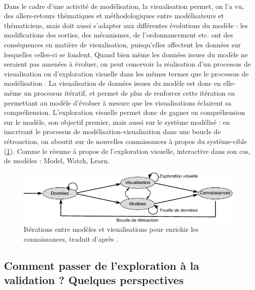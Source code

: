 \paragraph[Ccl : Modélisation et visualisation]{}
Dans le cadre d'une activité de modélisation, la visualisation permet, on l'a vu, des allers-retours thématiques et méthodologiques entre modélisateurs et thématiciens, mais doit aussi s'adapter aux différentes évolutions du modèle :
	les modifications des sorties, des mécanismes, de l'ordonnancement etc. ont des conséquences en matière de visualisation, puisqu'elles affectent les données sur lesquelles celles-ci se fondent.
Quand bien même les données issues du modèle ne seraient pas amenées à évoluer, on peut concevoir la réalisation d'un processus de visualisation ou d'exploration visuelle dans les mêmes termes que le processus de modélisation \autocite{andrienko2018viewing}.
La visualisation de données issues du modèle est donc en elle-même un processus itératif, et permet de plus de renforcer cette itération en permettant au modèle d'évoluer à mesure que les visualisations éclairent sa compréhension.
L'exploration visuelle permet donc de gagner en compréhension sur le modèle, son objectif premier, mais aussi sur le système modélisé :
	en inscrivant le processus de modélisation-visualisation dans une boucle de rétroaction, on aboutit sur de nouvelles connaissances à propos du système-cible (\cref{fig:schema-va}).
Comme le résume \textcite{victor_simulation_2009} à propos de l'exploration visuelle, interactive dans son cas, de modèles : \og Model, Watch, Learn\fg{}.

\begin{figure}[H]
	\centering
	\includegraphics[width=\linewidth]{img/schema_keim.pdf}
	
	\caption[Itérations entre modèles et visualisations pour enrichir les connaissances.]{Itérations entre modèles et visualisations pour enrichir les connaissances, traduit d'après \textcite[fig.~1, p.~156]{keim_visual_2008}.}
	\label{fig:schema-va}
\end{figure}


\subsection{Comment passer de l'exploration à la validation ? Quelques perspectives \label{subsec:perspectives-validation}}

